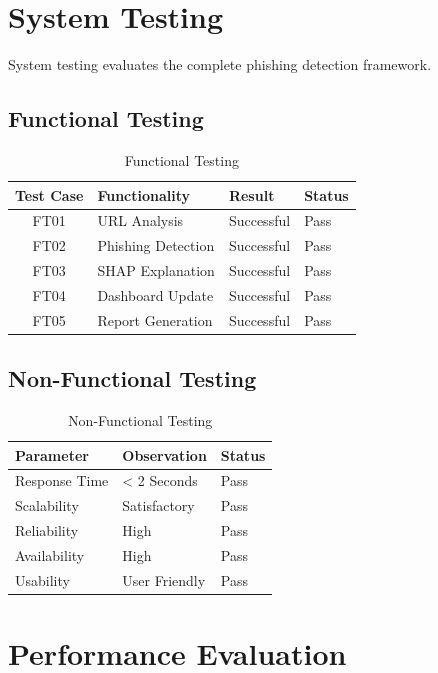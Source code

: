 \documentclass[12pt]{report}
\begin{document}
\section{System Testing}

System testing evaluates the complete phishing detection framework.

\subsection{Functional Testing}

\begin{table}[H]
\centering
\caption{Functional Testing}
\begin{tabular}{|c|p{5cm}|p{2cm}|p{2cm}|}
\hline
Test Case & Functionality & Result & Status \\
\hline
FT01 & URL Analysis & Successful & Pass \\
\hline
FT02 & Phishing Detection & Successful & Pass \\
\hline
FT03 & SHAP Explanation & Successful & Pass \\
\hline
FT04 & Dashboard Update & Successful & Pass \\
\hline
FT05 & Report Generation & Successful & Pass \\
\hline
\end{tabular}
\end{table}

\subsection{Non-Functional Testing}

\begin{table}[H]
\centering
\caption{Non-Functional Testing}
\begin{tabular}{|p{4cm}|p{3cm}|p{2cm}|}
\hline
Parameter & Observation & Status \\
\hline
Response Time & < 2 Seconds & Pass \\
\hline
Scalability & Satisfactory & Pass \\
\hline
Reliability & High & Pass \\
\hline
Availability & High & Pass \\
\hline
Usability & User Friendly & Pass \\
\hline
\end{tabular}
\end{table}

\section{Performance Evaluation}
\end{document}
